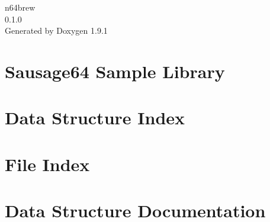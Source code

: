 \let\mypdfximage\pdfximage\def\pdfximage{\immediate\mypdfximage}\documentclass[twoside]{book}
\newcommand{\+}{\discretionary{\mbox{\scriptsize$\hookleftarrow$}}{}{}}
\newcommand{\clearemptydoublepage}{%
  \newpage{\pagestyle{empty}\cleardoublepage}%
}
\begin{document}
\raggedbottom

\hypersetup{pageanchor=false,
             bookmarksnumbered=true,
             pdfencoding=unicode
            }
\begin{titlepage}
\vspace*{7cm}
\begin{center}%
{\Large n64brew \\[1ex]\large 0.\+1.\+0 }\\
\vspace*{1cm}
{\large Generated by Doxygen 1.9.1}\\
\end{center}
\end{titlepage}
\clearemptydoublepage
{}
\tableofcontents
\clearemptydoublepage
{}
\hypersetup{pageanchor=true}

\chapter{Sausage64 Sample Library}
\label{md_src_sausage64_README}

\chapter{Data Structure Index}

\chapter{File Index}

\chapter{Data Structure Documentation}

\end{document}
